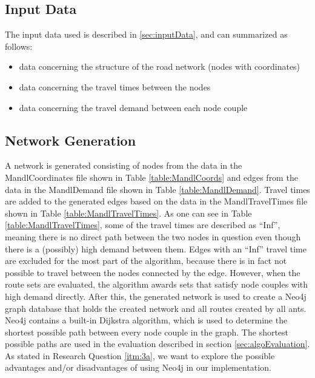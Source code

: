 \subsection{Input Data}
The input data used is described in \vref{sec:inputData}, and can summarized as follows:
\begin{itemize}
\item data concerning the structure of the road network (nodes with coordinates)
\item data concerning the travel times between the nodes 
\item data concerning the travel demand between each node couple
\end{itemize}

\subsection{Network Generation}
A network is generated consisting of nodes from the data in the MandlCoordinates file shown in Table \vref{table:MandlCoords} and edges from the data in the MandlDemand file shown in Table \vref{table:MandlDemand}. Travel times are added to the generated edges based on the data in the MandlTravelTimes file shown in Table \vref{table:MandlTravelTimes}. As one can see in Table \ref{table:MandlTravelTimes}, some of the travel times are described as ``Inf'', meaning there is no direct path between the two nodes in question even though there is a (possibly) high demand between them. Edges with an ``Inf'' travel time are excluded for the most part of the algorithm, because there is in fact not possible to travel between the nodes connected by the edge. However, when the route sets are evaluated, the algorithm awards sets that satisfy node couples with high demand directly. After this, the generated network is used to create a Neo4j graph database that holds the created network and all routes created by all ants. Neo4j contains a built-in Dijkstra algorithm, which is used to determine the shortest possible path between every node couple in the graph. The shortest possible paths are used in the evaluation described in section \vref{sec:algoEvaluation}. As stated in Research Question \vref{itm:3a}, we want to explore the possible advantages and/or disadvantages of using Neo4j in our implementation.
